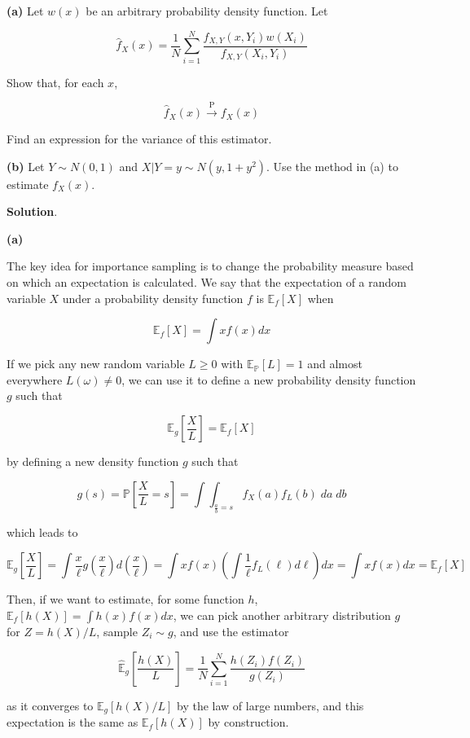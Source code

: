 \textbf{(a)} Let \(w(x)\) be an arbitrary probability density function.
Let

\[ \hat{f}_X(x) = \frac{1}{N} \sum_{i=1}^N \frac{f_{X, Y}(x, Y_{i})  w(X_{i})}{f_{X, Y}(X_{i}, Y_{i})} \]

Show that, for each \(x\),

\[ \hat{f}_X(x) \xrightarrow{\text{P}} f_X(x) \]

Find an expression for the variance of this estimator.

\textbf{(b)} Let \(Y \sim N(0, 1)\) and
\(X | Y = y \sim N(y, 1 + y^{2})\). Use the method in (a) to estimate
\(f_X(x)\).

\textbf{Solution}.

\textbf{(a)}

The key idea for importance sampling is to change the probability
measure based on which an expectation is calculated. We say that the
expectation of a random variable \(X\) under a probability density
function \(f\) is \(\mathbb{E}_f[X]\) when

\[ \mathbb{E}_f[X] = \int x f(x) dx\]

If we pick any new random variable \(L \geq 0\) with
\(\mathbb{E}_{\mathbb{P}}[L] = 1\) and almost everywhere
\(L(\omega) \neq 0\), we can use it to define a new probability density
function \(g\) such that

\[ \mathbb{E}_g\left[\frac{X}{L}\right] = \mathbb{E}_f[X] \]

by defining a new density function \(g\) such that

\[ 
g\left(s\right) = \mathbb{P}\left[\frac{X}{L} = s\right] = \int \int_{\frac{a}{b} = s} f_X(a) f_L(b) \; da\; db 
\]

which leads to

\[ \mathbb{E}_g\left[\frac{X}{L}\right] = \int \frac{x}{\ell} g\left(\frac{x}{\ell}\right) d \left( \frac{x}{\ell} \right) = \int x f(x) \left( \int \frac{1}{\ell} f_L(\ell) d\ell \right) dx  = \int x f(x) dx  = \mathbb{E}_f[X]\]

Then, if we want to estimate, for some function \(h\),
\(\mathbb{E}_f[h(X)] = \int h(x) f(x) dx\), we can pick another
arbitrary distribution \(g\) for \(Z = h(X) / L\), sample
\(Z_{i} \sim g\), and use the estimator

\[ \hat{\mathbb{E}}_g\left[\frac{h(X)}{L}\right] = \frac{1}{N} \sum_{i=1}^N \frac{h(Z_{i}) f(Z_{i})}{g(Z_{i})} \]

as it converges to \(\mathbb{E}_g\left[h(X) / L\right]\) by the law of
large numbers, and this expectation is the same as
\(\mathbb{E}_f[h(X)]\) by construction.

